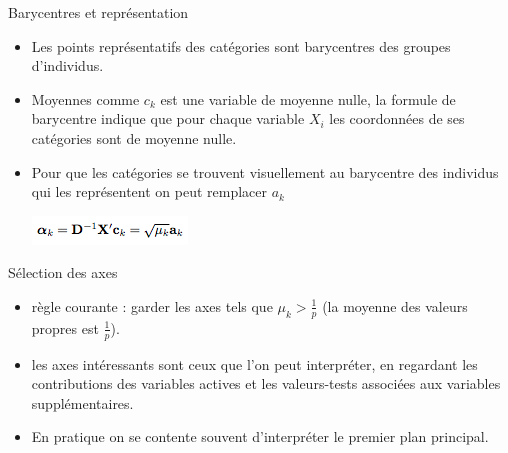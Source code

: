 \documentclass[12pt]{beamer}
\begin{document}
 





\begin{frame}{ Barycentres et représentation }
 
 \begin{itemize}
 
 \item  Les points représentatifs des catégories sont barycentres des groupes d'individus.
 
 \item Moyennes comme $c_k$ est une variable de moyenne nulle, la formule de barycentre indique que pour chaque variable $X_i$
les coordonnées de ses catégories  sont de moyenne nulle. 
 
 \item  Pour que les catégories se trouvent visuellement
au barycentre des individus qui les représentent on peut
remplacer $a_k$ 

\centering

 \includegraphics[scale=0.7]{AFC8} 
 
 \end{itemize}
 
 
\end{frame}


\begin{frame}{ Sélection des axes }
 
 \begin{itemize}
 \item  règle courante : garder les axes tels que $\mu_k > \frac{1}{p}$ (la moyenne des valeurs propres est $\frac{1}{p}$).
 \item  les axes intéressants sont ceux que l'on peut interpréter,
en regardant les contributions des variables actives et les valeurs-tests associées aux variables supplémentaires.
 \item En pratique on se contente souvent d’interpréter le
premier plan principal.
 \end{itemize}
 
 
\end{frame}



\end{document}
